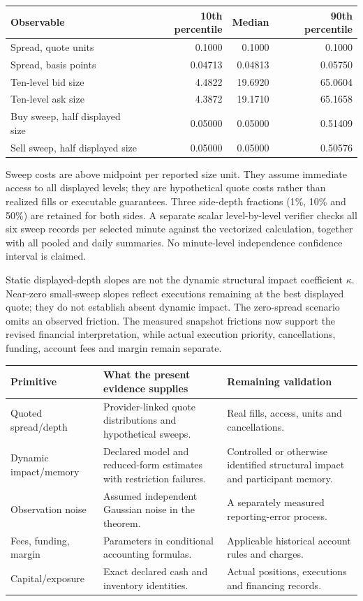 \documentclass[11pt]{article}
\begin{document}
\begin{center}
\begin{tabular}{lrrr}\toprule
Observable & 10th percentile & Median & 90th percentile \\\midrule
Spread, quote units & 0.1000 & 0.1000 & 0.1000 \\
Spread, basis points & 0.04713 & 0.04813 & 0.05750 \\
Ten-level bid size & 4.4822 & 19.6920 & 65.0604 \\
Ten-level ask size & 4.3872 & 19.1710 & 65.1658 \\
Buy sweep, half displayed size & 0.05000 & 0.05000 & 0.51409 \\
Sell sweep, half displayed size & 0.05000 & 0.05000 & 0.50576 \\
\bottomrule\end{tabular}\end{center}

Sweep costs are above midpoint per reported size unit. They assume immediate access to all displayed levels; they are hypothetical quote costs rather than realized fills or executable guarantees. Three side-depth fractions (1\%, 10\% and 50\%) are retained for both sides. A separate scalar level-by-level verifier checks all six sweep records per selected minute against the vectorized calculation, together with all pooled and daily summaries. No minute-level independence confidence interval is claimed.

Static displayed-depth slopes are not the dynamic structural impact coefficient $\kappa$. Near-zero small-sweep slopes reflect executions remaining at the best displayed quote; they do not establish absent dynamic impact. The zero-spread scenario omits an observed friction. The measured snapshot frictions now support the revised financial interpretation, while actual execution priority, cancellations, funding, account fees and margin remain separate.

\begin{center}\small
\begin{tabularx}{\textwidth}{p{3cm}XX}\toprule
Primitive & What the present evidence supplies & Remaining validation \\\midrule
Quoted spread/depth & Provider-linked quote distributions and hypothetical sweeps. & Real fills, access, units and cancellations. \\
Dynamic impact/memory & Declared model and reduced-form estimates with restriction failures. & Controlled or otherwise identified structural impact and participant memory. \\
Observation noise & Assumed independent Gaussian noise in the theorem. & A separately measured reporting-error process. \\
Fees, funding, margin & Parameters in conditional accounting formulas. & Applicable historical account rules and charges. \\
Capital/exposure & Exact declared cash and inventory identities. & Actual positions, executions and financing records. \\
\bottomrule\end{tabularx}\end{center}
\end{document}
